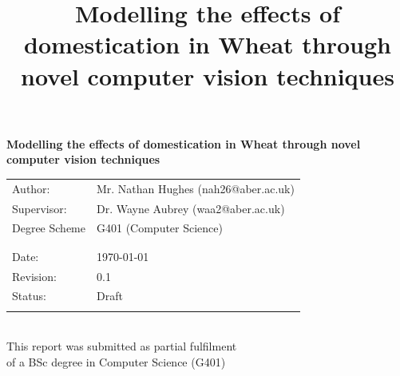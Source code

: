 \documentclass[11pt]{report}
\date{}
\title{\textbf{Modelling the effects of domestication in Wheat through novel computer vision techniques}}
\begin{document}

\titleformat{\chapter}[display]
   {\normalfont\huge\bfseries}{\chaptertitlename\ \thechapter}{20pt}{\Huge}
\titlespacing*{\chapter}{10pt}{10pt}{10pt}





\thispagestyle{empty}
\renewcommand{\headrulewidth}{0pt}
\begin{center}
  \fontsize{10}{12}
  \selectfont

  \textbf{\huge Modelling the effects of domestication in Wheat through novel computer vision techniques}

  \vspace{0.3in}

  \begin{tabular}[t]{ll}
    Author: & Mr. Nathan Hughes (nah26@aber.ac.uk) \\
    Supervisor: & Dr. Wayne Aubrey (waa2@aber.ac.uk) \\
    Degree Scheme &  G401 \hspace*{0.05in}(Computer Science)\\
    \\
    \\
    Date: & \today \\
    Revision: & 0.1\\
    Status: & Draft\\
    \\
  \end{tabular}
  \\
  \vspace{0.1in}
  This report was submitted as partial fulfilment \\of a BSc degree in Computer Science (G401)
\end{center}
\clearpage
\renewcommand{\headrulewidth}{1pt}
\end{document}
